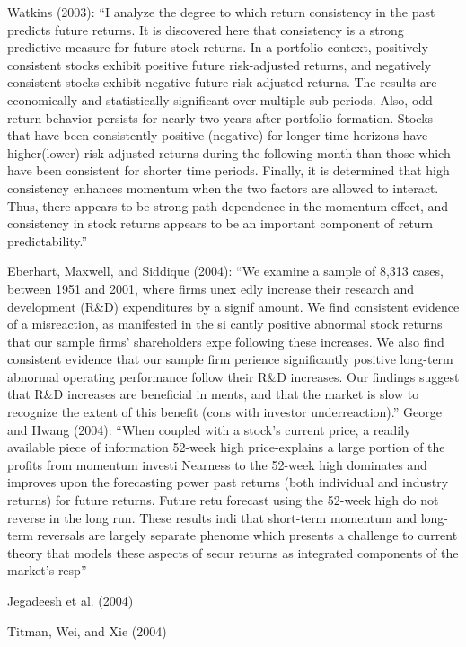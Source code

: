 \documentclass[
  letterpaper,
  DIV=11,
  numbers=noendperiod]{scrreprt}
\begin{document}
Watkins (2003): ``I analyze the degree to which return consistency in
the past predicts future returns. It is discovered here that consistency
is a strong predictive measure for future stock returns. In a portfolio
context, positively consistent stocks exhibit positive future
risk-adjusted returns, and negatively consistent stocks exhibit negative
future risk-adjusted returns. The results are economically and
statistically significant over multiple sub-periods. Also, odd return
behavior persists for nearly two years after portfolio formation. Stocks
that have been consistently positive (negative) for longer time horizons
have higher(lower) risk-adjusted returns during the following month than
those which have been consistent for shorter time periods. Finally, it
is determined that high consistency enhances momentum when the two
factors are allowed to interact. Thus, there appears to be strong path
dependence in the momentum effect, and consistency in stock returns
appears to be an important component of return predictability.''

Eberhart, Maxwell, and Siddique (2004): ``We examine a sample of 8,313
cases, between 1951 and 2001, where firms unex edly increase their
research and development (R\&D) expenditures by a signif amount. We find
consistent evidence of a misreaction, as manifested in the si cantly
positive abnormal stock returns that our sample firms' shareholders expe
following these increases. We also find consistent evidence that our
sample firm perience significantly positive long-term abnormal operating
performance follow their R\&D increases. Our findings suggest that R\&D
increases are beneficial in ments, and that the market is slow to
recognize the extent of this benefit (cons with investor
underreaction).'' George and Hwang (2004): ``When coupled with a stock's
current price, a readily available piece of information 52-week high
price-explains a large portion of the profits from momentum investi
Nearness to the 52-week high dominates and improves upon the forecasting
power past returns (both individual and industry returns) for future
returns. Future retu forecast using the 52-week high do not reverse in
the long run. These results indi that short-term momentum and long-term
reversals are largely separate phenome which presents a challenge to
current theory that models these aspects of secur returns as integrated
components of the market's resp''

Jegadeesh et al. (2004)

Titman, Wei, and Xie (2004)
\end{document}
